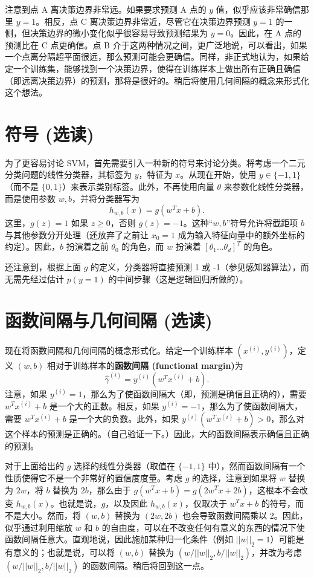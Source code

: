 注意到点 A 离决策边界非常远。如果要求预测 A 点的 $y$ 值，似乎应该非常确信那里 $y=1$。相反，点 C 离决策边界非常近，尽管它在决策边界预测 $y=1$ 的一侧，但决策边界的微小变化似乎很容易导致预测结果为 $y=0$。因此，在 A 点的预测比在 C 点更确信。点 B 介于这两种情况之间，更广泛地说，可以看出，如果一个点离分隔超平面很远，那么预测可能会更确信。同样，非正式地认为，如果给定一个训练集，能够找到一个决策边界，使得在训练样本上做出所有正确且确信（即远离决策边界）的预测，那将是很好的。稍后将使用几何间隔的概念来形式化这个想法。

\section{符号 (选读)}

为了更容易讨论 SVM，首先需要引入一种新的符号来讨论分类。将考虑一个二元分类问题的线性分类器，其标签为 $y$，特征为 $x$。从现在开始，使用 $y \in \{-1, 1\}$（而不是 $\{0, 1\}$）来表示类别标签。此外，不再使用向量 $\theta$ 来参数化线性分类器，而是使用参数 $w, b$，并将分类器写为
\[
    h_{w,b}(x) = g(w^T x + b).
\]
这里，$g(z) = 1$ 如果 $z \ge 0$，否则 $g(z) = -1$。这种“$w, b$”符号允许将截距项 $b$ 与其他参数分开处理（还放弃了之前让 $x_0 = 1$ 成为输入特征向量中的额外坐标的约定）。因此，$b$ 扮演着之前 $\theta_0$ 的角色，而 $w$ 扮演着 $[\theta_1 \dots \theta_d]^T$ 的角色。

还注意到，根据上面 $g$ 的定义，分类器将直接预测 1 或 -1（参见感知器算法），而无需先经过估计 $p(y=1)$ 的中间步骤（这是逻辑回归所做的）。

\section{函数间隔与几何间隔 (选读)}\label{sec:6.3}

现在将函数间隔和几何间隔的概念形式化。给定一个训练样本 $(x^{(i)}, y^{(i)})$，定义 $(w,b)$ 相对于训练样本的\textbf{函数间隔 (functional margin)}为
\[
    \hat{\gamma}^{(i)} = y^{(i)}(w^T x^{(i)} + b).
\]
注意，如果 $y^{(i)} = 1$，那么为了使函数间隔大（即，预测是确信且正确的），需要 $w^T x^{(i)} + b$ 是一个大的正数。相反，如果 $y^{(i)} = -1$，那么为了使函数间隔大，需要 $w^T x^{(i)} + b$ 是一个大的负数。此外，如果 $y^{(i)}(w^T x^{(i)} + b) > 0$，那么对这个样本的预测是正确的。（自己验证一下。）因此，大的函数间隔表示确信且正确的预测。

对于上面给出的 $g$ 选择的线性分类器（取值在 $\{-1, 1\}$ 中），然而函数间隔有一个性质使得它不是一个非常好的置信度度量。考虑 $g$ 的选择，注意到如果将 $w$ 替换为 $2w$，将 $b$ 替换为 $2b$，那么由于 $g(w^T x + b) = g(2w^T x + 2b)$，这根本不会改变 $h_{w,b}(x)$。也就是说，$g$，以及因此 $h_{w,b}(x)$，仅取决于 $w^T x + b$ 的符号，而不是大小。然而，将 $(w,b)$ 替换为 $(2w, 2b)$ 也会导致函数间隔乘以 2。因此，似乎通过利用缩放 $w$ 和 $b$ 的自由度，可以在不改变任何有意义的东西的情况下使函数间隔任意大。直观地说，因此施加某种归一化条件（例如 $||w||_2 = 1$）可能是有意义的；也就是说，可以将 $(w,b)$ 替换为 $(w/||w||_2, b/||w||_2)$，并改为考虑 $(w/||w||_2, b/||w||_2)$ 的函数间隔。稍后将回到这一点。

